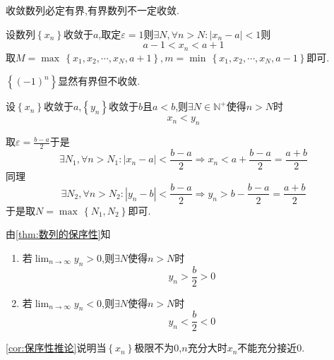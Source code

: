 \begin{formal}
    \begin{theorem}[收敛与有界]\label{thm:收敛与有界}
        收敛数列必定有界,有界数列不一定收敛.
    \end{theorem}
    \begin{Proof}
        设数列$\left\{x_n\right\}$收敛于$a$,取定$\varepsilon=1$则$\exists N,\forall n>N:\left|x_n-a\right|<1$则\[
        a-1<x_n<a+1
        \]取$M=\max\,\left\{x_1,x_2,\cdots,x_N,a+1\right\},m=\min\,\left\{
            x_1,x_2,\cdots,x_N,a-1
        \right\}$即可.

        $\left\{
            \left(-1\right)^n
        \right\}$显然有界但不收敛.
    \end{Proof}
\end{formal}
\begin{formal}
    \begin{theorem}[数列的保序性]\label{thm:数列的保序性}
        设$\left\{x_n\right\}$收敛于$a$,$\left\{y_n\right\}$收敛于$b$且$a<b$,则$\exists N\in\mathbb{N}^+$使得$n>N$时\[
        x_n<y_n
        \]
    \end{theorem}
    \begin{Proof}
        取$\displaystyle \varepsilon=\frac{b-a}{2}$于是\[
        \exists N_1,\forall n>N_1:\left|x_n-a\right|<\frac{b-a}{2}\Longrightarrow x_n<a+\frac{b-a}{2}=\frac{a+b}{2}
        \]同理\[
        \exists N_2,\forall n>N_2:\left|y_n-b\right|<\frac{b-a}{2}\Longrightarrow y_n>b-\frac{b-a}{2}=\frac{a+b}{2}
        \]于是取$N=\max\,\left\{N_1,N_2\right\}$即可.
    \end{Proof}
\end{formal}
\begin{green}
    \begin{corollary}[保序性推论]\label{cor:保序性推论}
        由\cref{thm:数列的保序性}知\begin{enumerate}[label={\textup{(\arabic*)}}]
            \item 若$\displaystyle \lim_{n\to\infty}y_n>0$,则$\exists N$使得$n>N$时\[
            y_n>\frac{b}{2}>0
            \]
            \item 若$\displaystyle \lim_{n\to\infty}y_n<0$,则$\exists N$使得$n>N$时\[
             y_n<\frac{b}{2}<0
             \]
        \end{enumerate}
    \end{corollary}
\end{green}
\begin{red}
    \begin{remark}
        \cref{cor:保序性推论}说明当$\left\{x_n\right\}$极限不为$0$,$n$充分大时$x_n$不能充分接近$0$.
    \end{remark}
\end{red}
